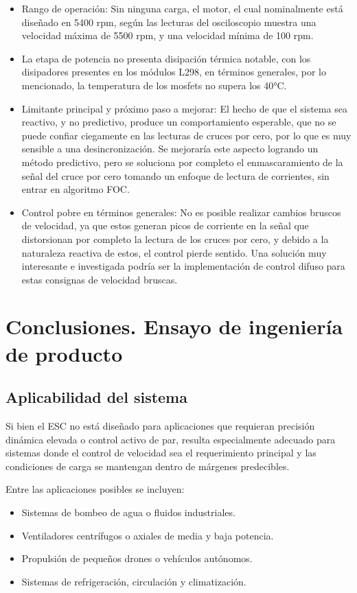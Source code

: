 \begin{itemize}
    \item Rango de operación: Sin ninguna carga, el motor, el cual nominalmente está diseñado en 5400 rpm, según las lecturas del osciloscopio muestra una velocidad máxima de 5500 rpm, y una velocidad mínima de 100 rpm.
    \item La etapa de potencia no presenta disipación térmica notable, con los disipadores presentes en los módulos L298, en términos generales, por lo mencionado, la temperatura de los mosfets no supera los 40°C.
    \item Limitante principal y próximo paso a mejorar: El hecho de que el sistema sea reactivo, y no predictivo, produce un comportamiento esperable, que no se puede confiar ciegamente en las lecturas de cruces por cero, por lo que es muy sensible a una desincronización. Se mejoraría este aspecto logrando un método predictivo, pero se soluciona por completo el enmascaramiento de la señal del cruce por cero tomando un enfoque de lectura de corrientes, sin entrar en algoritmo FOC.
    \item Control pobre en términos generales: No es posible realizar cambios bruscos de velocidad, ya que estos generan picos de corriente en la señal que distorsionan por completo la lectura de los cruces por cero, y debido a la naturaleza reactiva de estos, el control pierde sentido. Una solución muy interesante e investigada podría ser la implementación de control difuso para estas consignas de velocidad bruscas.
\end{itemize}

\section{Conclusiones. Ensayo de ingeniería de producto}

\subsection*{Aplicabilidad del sistema}

Si bien el ESC no está diseñado para aplicaciones que requieran precisión dinámica elevada o control activo de par, resulta especialmente adecuado para sistemas donde el control de velocidad sea el requerimiento principal y las condiciones de carga se mantengan dentro de márgenes predecibles.

Entre las aplicaciones posibles se incluyen:

\begin{itemize}
    \item Sistemas de bombeo de agua o fluidos industriales.
    \item Ventiladores centrífugos o axiales de media y baja potencia.
    \item Propulsión de pequeños drones o vehículos autónomos.
    \item Sistemas de refrigeración, circulación y climatización.
\end{itemize}

